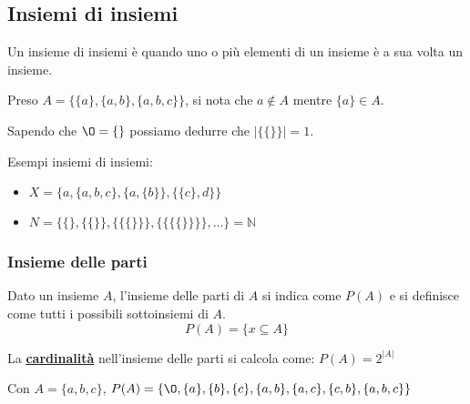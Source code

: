 \subsection{Insiemi di insiemi}
\begin{definition}
Un insieme di insiemi è quando uno o più elementi di un insieme è a sua volta un insieme.
\end{definition}
\begin{note}
	Preso $A = \{\{a\}, \{a, b\}, \{a, b, c\}\}$, si nota che $a \notin A$ mentre $\{a\} \in A$.
\end{note}
\begin{note}
	Sapendo che $\O = \{\}$ possiamo dedurre che $\lvert \{\{\}\}\rvert = 1$.
\end{note}
\begin{example}
Esempi insiemi di insiemi:
    \begin{itemize}
        \item $X = \{a, \{a, b, c\}, \{a, \{b\}\}, \{\{c\},d\}\}$
        \item $N = \{\{\}, \{\{\}\}, \{\{\{\}\}\}, \{\{\{\{\}\}\}\}, ...\} = \mathbb{N}$
    \end{itemize}
\end{example}

\subsubsection{Insieme delle parti}
\begin{definition}
Dato un insieme $A$, l'insieme delle parti di $A$ si indica come $P(A)$ e si definisce come tutti i possibili sottoinsiemi di $A$.
\begin{equation}
	P(A) = \{x \subseteq A\}
\end{equation}
\begin{note}
	La \hyperref[sec:cardinalita]{\textbf{cardinalità}} nell'insieme delle parti si calcola come: $P(A) = 2^{|A|}$
\end{note}
\end{definition}
\begin{example}
    Con $A = \{a, b, c\}$, $P(A) = \{\O, \{a\}, \{b\}, \{c\}, \{a, b\}, \{a, c\}, \{c, b\}, \{a, b, c\}\}$
\end{example}
